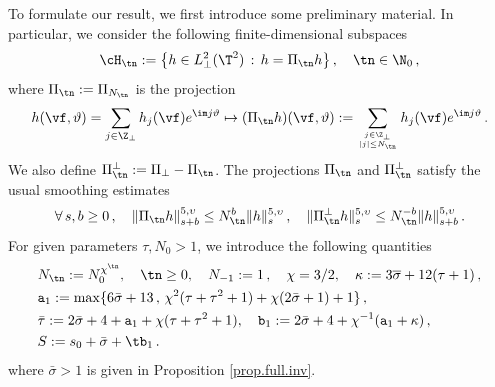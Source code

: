 \documentclass[a4paper,reqno,10pt]{article}
\begin{document}
To formulate our result, we first introduce some preliminary material. In particular, we consider the following finite-dimensional subspaces
\begin{equation}
    \cH_{\tn} := \big\{ h \in L_{\perp}^2(\T^2) \, : \, h = \Pi_{\tn} h \big\}\,, \quad \tn \in \N_{0} \,,
\end{equation}
where $\Pi_{\tn}:= \Pi_{N_{\tn}} $ is the projection
\begin{equation}
    h(\vf,\vartheta) = \sum_{j \in \Z_{\perp}} h_j(\vf) e^{\im j\vartheta} \mapsto (\Pi_{\tn}h)(\vf,\vartheta) := \sum_{j\in \Z_{\perp} \atop |j|\leq N_{\tn}} h_{j}(\vf) e^{\im j\vartheta} \,.
\end{equation}
We also define $\Pi_{\tn}^\perp:= \Pi_{\perp} - \Pi_{\tn}$. The projections $\Pi_{\tn}$ and $\Pi_{\tn}^\perp$ satisfy the usual smoothing estimates
\begin{equation}\label{std.smoothing}
  \forall\,s,b\geq 0 \,, \quad   \| \Pi_{\tn}h \|_{s+b}^{5,\upsilon} \leq N_{\tn}^{b} \| h \|_{s}^{5,\upsilon} \,, \quad   \| \Pi_{\tn}^\perp h \|_{s}^{5,\upsilon} \leq N_{\tn}^{-b} \| h \|_{s+b}^{5,\upsilon} \,.
\end{equation}
For given parameters $\tau, N_{0}>1$, we introduce  the following quantities 
\begin{equation} \label{constants.NASH}
\begin{aligned}
& N_{\tn} := N_{0}^{\chi^\tn}, \quad \tn \geq 0, \quad N_{- 1} := 1\,, \quad \chi = 3/2, \quad  \kappa := 3\overline{\sigma} +12(\tau+1) \,, \\
&  \mathtt a_1 := {\rm max}\{ 6 \bar \sigma + 13\,,\, \chi^2(\tau + \tau^2 + 1) + \chi(2 \bar \sigma + 1) + 1 \} \,, \\
& \bar \tau := 2 \bar \sigma + 4 + \mathtt a_1 + \chi(\tau + \tau^2 + 1), \quad {\mathtt b}_1 := 2 \bar \sigma + 4  +\chi^{-1} ( \mathtt a_1 + \kappa)\,, \\
 & S:= s_0 + \bar\sigma + \tb_{1} \,.
\end{aligned}
\end{equation}
where $\bar \sigma > 1$ is given in Proposition \ref{prop.full.inv}. 
\end{document}
